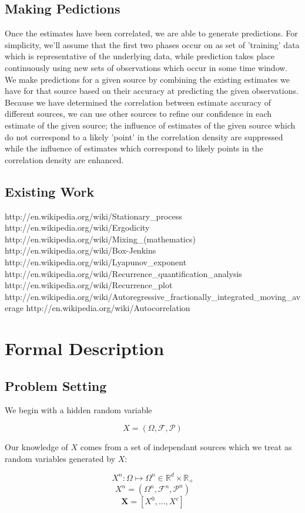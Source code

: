 \documentclass[10pt]{article}
\begin{document}
\subsection{Making Pedictions}
Once the estimates have been correlated, we are able to generate predictions.  For simplicity, we'll assume that the first two phases occur on as set of 'training' data which is representative of the underlying data, while prediction takes place continuously using new sets of observations which occur in some time window.  We make predictions for a given source by combining the existing estimates we have for that source based on their accuracy at predicting the given observations.  Because we have determined the correlation between estimate accuracy of different sources, we can use other sources to refine our confidence in each estimate of the given source; the influence of estimates of the given source which do not correspond to a likely 'point' in the correlation density are suppressed while the influence of estimates which correspond to likely points in the correlation density are enhanced.

\subsection{Existing Work}
http://en.wikipedia.org/wiki/Stationary_process
http://en.wikipedia.org/wiki/Ergodicity
http://en.wikipedia.org/wiki/Mixing_(mathematics)
http://en.wikipedia.org/wiki/Box-Jenkins
http://en.wikipedia.org/wiki/Lyapunov_exponent
http://en.wikipedia.org/wiki/Recurrence_quantification_analysis
http://en.wikipedia.org/wiki/Recurrence_plot
http://en.wikipedia.org/wiki/Autoregressive_fractionally_integrated_moving_average
http://en.wikipedia.org/wiki/Autocorrelation

\section{Formal Description}
\subsection{Problem Setting}
We begin with a hidden random variable 

\[ X = (\Omega,\mathcal{F},\mathcal{P}) \]

Our knowledge of \( X \) comes from a set of independant sources which we treat as random variables generated by \( X \):

\[ X^n : \Omega \mapsto \Omega^n \in \mathbb{R}^d \times \mathbb{R}_+  \]
\[ X^n = (\Omega^n,\mathcal{F}^n,\mathcal{P}^n) \]
\[ \mathbf{X} = [X^0,...,X^c]   \]
\end{document}
